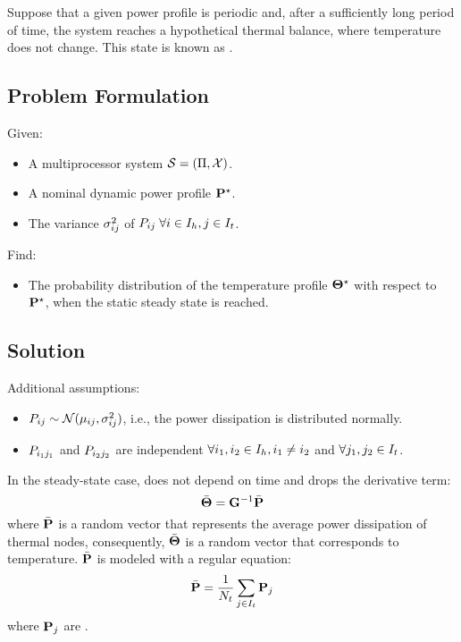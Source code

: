 Suppose that a given power profile is periodic and, after a sufficiently long period of time, the system reaches a hypothetical thermal balance, where temperature does not change. This state is known as .

\subsection{Problem Formulation}
Given:
\begin{itemize}
  \item A multiprocessor system $\mathcal{S} = (\Pi, \mathcal{X})$.
  \item A nominal dynamic power profile $\mathbf{P}^\star$.
  \item The variance $\sigma_{ij}^2$ of $P_{ij} \; \forall i \in I_h, j \in I_t$.
\end{itemize}

Find:
\begin{itemize}
  \item The probability distribution of the temperature profile $\mathbf{\Theta}^\star$ with respect to $\mathbf{P}^\star$, when the static steady state is reached.
\end{itemize}

\subsection{Solution} 
Additional assumptions:
\begin{itemize}
  \item $P_{ij} \sim \mathcal{N}(\mu_{ij}, \sigma_{ij}^2)$, i.e., the power dissipation is distributed normally.
  \item $P_{i_1 j_1}$ and $P_{i_2 j_2}$ are independent $\forall i_1, i_2 \in I_h,  i_1 \neq i_2$ and $\forall j_1, j_2 \in I_t$.
\end{itemize}

In the steady-state case,  does not depend on time and drops the derivative term:
\begin{equation} \equlabel{steady-fourier}
  \a{\vtemperature} = \mconductance^{-1} \a{\vpower}
\end{equation}
where $\bar{\mathbf{P}}$ is a random vector that represents the average power dissipation of thermal nodes, consequently, $\bar{\mathbf{\Theta}}$ is a random vector that corresponds to temperature. $\bar{\mathbf{P}}$ is modeled with a regular equation:
\[
  \bar{\mathbf{P}} = \frac{1}{N_t} \sum_{j \in I_t} \mathbf{P}_j
\]
where $\mathbf{P}_j$ are \mnrvs.

